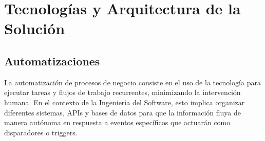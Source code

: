 \documentclass[12pt, a4paper]{book}
\begin{document}




\setmainfont{Carlito}

\frontmatter 


\tableofcontents	%
\listoffigures		%
\listoftables		%
\listofalgorithms   %
\listofcodes	    %
\cleardoublepage

\mainmatter
\pagestyle{fancy}

 

 

 

\appendix
\chapter{Tecnologías y Arquitectura de la Solución}
\label{ap:tecnologias}
\section{Automatizaciones}

La automatización de procesos de negocio consiste en el uso de la tecnología para ejecutar tareas y flujos de trabajo recurrentes, minimizando la intervención humana. En el contexto de la Ingeniería del Software, esto implica organizar diferentes sistemas, APIs y bases de datos para que la información fluya de manera autónoma en respuesta a eventos específicos que actuarán como disparadores o triggers.
\end{document}
